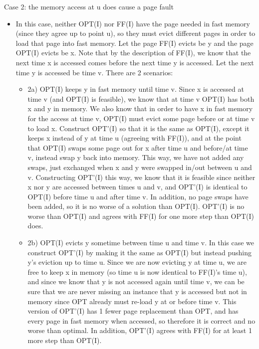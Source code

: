 \documentclass[a4paper]{article}
\begin{document}
Case 2: the memory access at u does cause a page fault
\begin{itemize}
\item In this case, neither OPT(I) nor FF(I) have the page needed in fast memory (since they agree up to point u), so they must evict different pages in order to load that page into fast memory. Let the page FF(I) evicts be y and the page OPT(I) evicts be x. Note that by the description of FF(I), we know that the next time x is accessed comes before the next time y is accessed. Let the next time y is accessed be time v.
There are 2 scenarios:
\begin{itemize}
\item 2a) OPT(I) keeps y in fast memory until time v. Since x is accessed at time v (and OPT(I) is feasible), we know that at time v OPT(I) has both x and y in memory. We also know that in order to have x in fast memory for the access at time v, OPT(I) must evict some page before or at time v to load x. Construct OPT'(I) so that it is the same as OPT(I), except it keeps x instead of y at time u (agreeing with FF(I)), and at the point that OPT(I) swaps some page out for x after time u and before/at time v, instead swap y back into memory. This way, we have not added any swaps, just exchanged when x and y were swapped in/out between u and v. Constructing OPT'(I) this way, we know that it is feasible since neither x nor y are accessed between times u and v, and OPT'(I) is identical to OPT(I) before time u and after time v. In addition, no page swaps have been added, so it is no worse of a solution than OPT(I). OPT'(I) is no worse than OPT(I) and agrees with FF(I) for one more step than OPT(I) does.
\item 2b) OPT(I) evicts y sometime between time u and time v. In this case we construct OPT'(I) by making it the same as OPT(I) but instead pushing y's eviction up to time u. Since we are now evicting y at time u, we are free to keep x in memory (so time u is now identical to FF(I)'s time u), and since we know that y is not accessed again until time v, we can be sure that we are never missing an instance that y is accessed but not in memory since OPT already must re-load y at or before time v. This version of OPT'(I) has 1 fewer page replacement than OPT, and has every page in fast memory when accessed, so therefore it is correct and no worse than optimal. In addition, OPT'(I) agrees with FF(I) for at least 1 more step than OPT(I).
\end{itemize}
\end{itemize}
\end{document}
